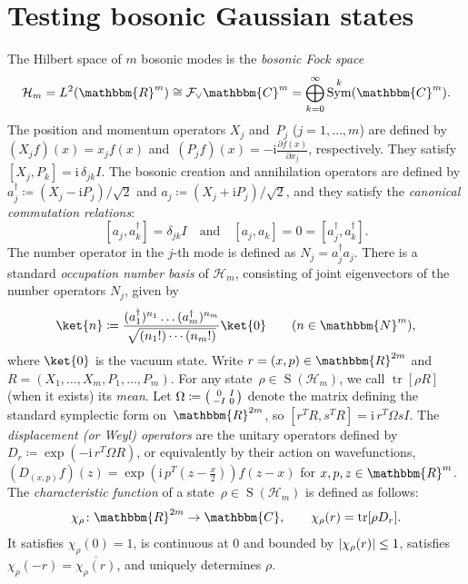 \documentclass[11pt,a4paper]{article}
\numberwithin{equation}{section}
\newcommand{\RR}{\mathbbm{R}}
\newcommand{\CC}{\mathbbm{C}}
\newcommand{\NN}{\mathbbm{N}}
\newcommand{\HH}{\mathcal{H}}
\newcommand{\id}{I}
\newcommand{\1}{\mathbf{1}}
\renewcommand{\S}{\operatorname{S}}
\DeclareMathOperator{\tr}{tr}
\DeclareMathOperator{\Sym}{Sym}
\DeclarePairedDelimiter\abs{\lvert}{\rvert}
\begin{document}
\section{Testing bosonic Gaussian states}\label{sec:bosons}
The Hilbert space of $m$ bosonic modes is the \emph{bosonic Fock space}
\begin{align*}
    \HH_m = L^2(\RR^m) \cong \mathcal F_\vee \CC^m = \bigoplus_{k=0}^{\infty} \Sym^k(\CC^m).
\end{align*}
The position and momentum operators $X_j$ and~$P_j$ ($j=1,\ldots,m$) are defined by~$(X_j f)(x) = x_j f(x)$ and~$(P_j f)(x) = -\mathrm{i} \frac{\partial f (x)}{\partial x_j}$, respectively.
They satisfy $[X_j,P_k] = \mathrm{i}\,\delta_{jk} \id$.
The bosonic creation and annihilation operators are defined by $a_j^\dagger \coloneqq (X_j - \mathrm{i} P_j)/\sqrt2$ and $a_j \coloneqq (X_j + \mathrm{i} P_j)/\sqrt2$, and they satisfy the \emph{canonical commutation relations}:
\[ [a_j, a_k^\dagger] = \delta_{jk}I \quad\text{and}\quad [a_j, a_k] = 0 = [a_j^\dagger,a_k^\dagger]. \]
The number operator in the $j$-th mode is defined as $N_j = a_j^\dagger a_j$.
There is a standard \emph{occupation number basis} of $\HH_m$, consisting of joint eigenvectors of the number operators $N_j$, given by
\begin{align*}
    \ket{n} \coloneqq \frac{(a_1^\dagger)^{n_1} \dots (a_m^\dagger)^{n_m}}{\sqrt{(n_1!) \cdots (n_m!)}} \ket{0} \qquad (n \in \NN^m),
\end{align*}
where $\ket{0}$ is the vacuum state.
Write $r=(x,p)\in \RR^{2m}$ and $R = (X_1,\ldots,X_m,P_1,\ldots,P_m)$.
For any state~$\rho \in \S(\HH_m)$, we call $\tr[\rho R]$ (when it exists) its \emph{mean}.
Let $\Omega \coloneqq \begin{psmallmatrix}0 & I\\-I & 0\end{psmallmatrix}$ denote the matrix defining the standard symplectic form on~$\RR^{2m}$, so $[r^TR, s^TR] = \mathrm{i} \, r^T\Omega s \id$.
The \emph{displacement (or Weyl) operators} are the unitary operators defined by $D_r \coloneqq \exp( -\mathrm{i}\, r^T\Omega R)$, or equivalently by their action on wavefunctions, $(D_{(x,p)} f)(z) = \exp(\mathrm{i}\,p^T(z-\frac{x}{2})) f(z-x)$ for $x,p,z\in\RR^m$.
The \emph{characteristic function} of a state~$\rho \in \S(\HH_m)$ is defined as follows:
\begin{align*}
    \chi_\rho \colon \RR^{2m}\to \CC, \qquad \chi_\rho(r)=\tr[\rho D_r].
\end{align*}
It satisfies $\chi_\rho(0)=1$, is continuous at $0$ and bounded by $\abs{\chi_\rho(r)} \leq 1$, satisfies $\chi_\rho(-r)=\overline{\chi_\rho(r)}$, and uniquely determines $\rho$.
\end{document}
